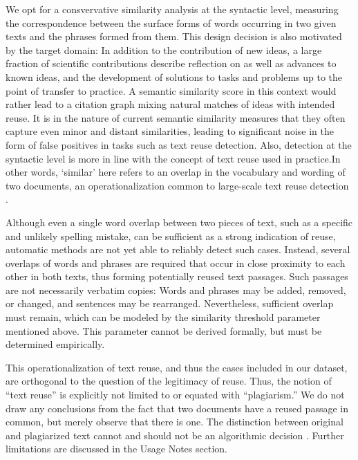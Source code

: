 We opt for a consvervative similarity analysis at the syntactic level, measuring the correspondence between the surface forms of words occurring in two given texts and the phrases formed from them. This design decision is also motivated by the target domain: In addition to the contribution of new ideas, a large fraction of scientific contributions describe reflection on as well as advances to known ideas, and the development of solutions to tasks and problems up to the point of transfer to practice. A semantic similarity score in this context would rather lead to a citation graph mixing natural matches of ideas with intended reuse. It is in the nature of current semantic similarity measures that they often capture even minor and distant similarities, leading to significant noise in the form of false positives in tasks such as text reuse detection. Also, detection at the syntactic level is more in line with the concept of text reuse used in practice.In other words, `similar' here refers to an overlap in the vocabulary and wording of two documents, an operationalization common to large-scale text reuse detection \cite{martin:2015}.

Although even a single word overlap between two pieces of text, such as a specific and unlikely spelling mistake, can be sufficient as a strong indication of reuse, automatic methods are not yet able to reliably detect such cases. Instead, several overlaps of words and phrases are required that occur in close proximity to each other in both texts, thus forming potentially reused text passages. Such passages are not necessarily verbatim copies: Words and phrases may be added, removed, or changed, and sentences may be rearranged. Nevertheless, sufficient overlap must remain, which can be modeled by the similarity threshold parameter mentioned above. This parameter cannot be derived formally, but must be determined empirically.

This operationalization of text reuse, and thus the cases included in our dataset, are orthogonal to the question of the legitimacy of reuse. Thus, the notion of ``text reuse'' is explicitly not limited to or equated with ``plagiarism.'' We do not draw any conclusions from the fact that two documents have a reused passage in common, but merely observe that there is one. The distinction between original and plagiarized text cannot and should not be an algorithmic decision \cite{weber-wulff:2019}. Further limitations are discussed in the Usage Notes section.



